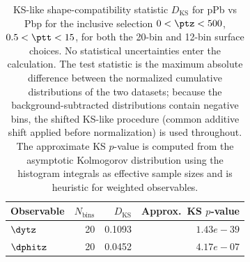 \begin{table}[hbtp]
\centering
\begin{tabular}{|l|r|r|r|}
\hline
Observable & $N_{\mathrm{bins}}$ & $D_{\mathrm{KS}}$ & Approx.\ KS $p$-value \\
\hline
$\dytz$ & 20 & 0.1093 & $1.43e-39$ \\
$\dphitz$ & 20 & 0.0452 & $4.17e-07$ \\
\hline
\end{tabular}
\caption{KS-like shape-compatibility statistic $D_{\mathrm{KS}}$ for pPb vs Pbp for the inclusive selection $0 < \ptz < 500$\GeV, $0.5 < \ptt < 15$\GeV, for both the 20-bin and 12-bin surface choices. No statistical uncertainties enter the calculation. The test statistic is the maximum absolute difference between the normalized cumulative distributions of the two datasets; because the background-subtracted distributions contain negative bins, the shifted KS-like procedure (common additive shift applied before normalization) is used throughout. The approximate KS $p$-value is computed from the asymptotic Kolmogorov distribution using the histogram integrals as effective sample sizes and is heuristic for weighted observables.}
\label{table:combining_ks}
\end{table}
